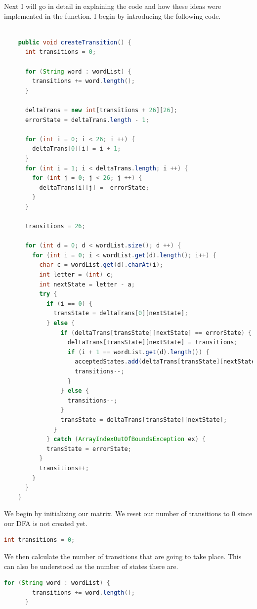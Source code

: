 \documentclass[letter, 12pt]{article}
\begin{document}
Next I will go in detail in explaining the code and how these ideas were implemented in the function. I begin by introducing the following code.
\begin{lstlisting}[language=Java, caption=Delta Table Creation Function, style=blockcode]

    public void createTransition() {
      int transitions = 0;

      for (String word : wordList) {
        transitions += word.length();
      }
      
      deltaTrans = new int[transitions + 26][26];
      errorState = deltaTrans.length - 1;

      for (int i = 0; i < 26; i ++) {
        deltaTrans[0][i] = i + 1;
      }
      for (int i = 1; i < deltaTrans.length; i ++) {
        for (int j = 0; j < 26; j ++) {
          deltaTrans[i][j] =  errorState;
        }
      }

      transitions = 26;

      for (int d = 0; d < wordList.size(); d ++) {
        for (int i = 0; i < wordList.get(d).length(); i++) {
          char c = wordList.get(d).charAt(i);
          int letter = (int) c;
          int nextState = letter - a;
          try {
            if (i == 0) {
              transState = deltaTrans[0][nextState];
            } else {
                if (deltaTrans[transState][nextState] == errorState) {
                  deltaTrans[transState][nextState] = transitions;
                  if (i + 1 == wordList.get(d).length()) {
                    acceptedStates.add(deltaTrans[transState][nextState]);
                    transitions--;
                  }
                } else {
                  transitions--;
                }
                transState = deltaTrans[transState][nextState];
              }
            } catch (ArrayIndexOutOfBoundsException ex) {
            transState = errorState;
          }
          transitions++;
        }
      }
    }
\end{lstlisting}
We begin by initializing our matrix. We reset our number of transitions to 0 since our DFA is not created yet.
\begin{lstlisting}[language=Java]
      int transitions = 0;
\end{lstlisting}
We then calculate the number of transitions that are going to take place. This can also be understood as the number of states there are. 
 \begin{lstlisting}[language=Java]
      for (String word : wordList) {
        transitions += word.length();
      }
\end{lstlisting}
\end{document}
